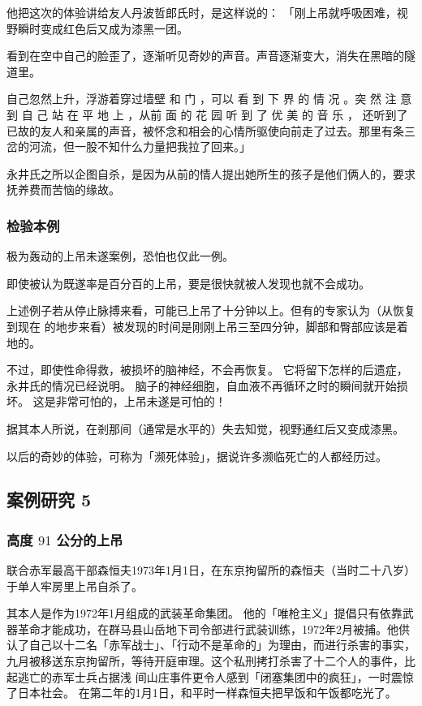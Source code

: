 \documentclass[UTF8]{ctexart}
\begin{document}
他把这次的体验讲给友人丹波哲郎氏时，是这样说的： 「刚上吊就呼吸困难，视野瞬时变成红色后又成为漆黑一团。

看到在空中自己的脸歪了，逐渐听见奇妙的声音。声音逐渐变大，消失在黑暗的隧道里。

自己忽然上升，浮游着穿过墙壁 和 门 ，可以 看 到 下 界 的 情 况 。突 然 注 意 到 自 己 站 在 平 地 上 ，从前 面 的 花 园 听 到 了 优 美 的 音 乐 ， 还听到了已故的友人和亲属的声音，被怀念和相会的心情所驱使向前走了过去。那里有条三岔的河流，但一股不知什么力量把我拉了回来。」 

永井氏之所以企图自杀，是因为从前的情人提出她所生的孩子是他们俩人的，要求抚养费而苦恼的缘故。

\subsubsection*{检验本例}

极为轰动的上吊未遂案例，恐怕也仅此一例。

即使被认为既遂率是百分百的上吊，要是很快就被人发现也就不会成功。

上述例子若从停止脉搏来看，可能已上吊了十分钟以上。但有的专家认为（从恢复到现在
的地步来看）被发现的时间是刚刚上吊三至四分钟，脚部和臀部应该是着地的。

不过，即使性命得救，被损坏的脑神经，不会再恢复。
它将留下怎样的后遗症，永井氏的情况已经说明。
脑子的神经细胞，自血液不再循环之时的瞬间就开始损坏。
这是非常可怕的，上吊未遂是可怕的！

据其本人所说，在剎那间（通常是水平的）失去知觉，视野通红后又变成漆黑。

以后的奇妙的体验，可称为「濒死体验」，据说许多濒临死亡的人都经历过。

\subsection{案例研究 5}
\subsubsection*{高度 $91$ 公分的上吊}

联合赤军最高干部森恒夫1973年1月1日，在东京拘留所的森恒夫（当时二十八岁）于单人牢房里上吊自杀了。

其本人是作为1972年1月组成的武装革命集团。
他的「唯枪主义」提倡只有依靠武器革命才能成功，在群马县山岳地下司令部进行武装训练，1972年2月被捕。他供认了自己以十二名「赤军战士」、「行动不是革命的」为理由，而进行杀害的事实，九月被移送东京拘留所，等待开庭审理。这个私刑拷打杀害了十二个人的事件，比起逃亡的赤军士兵占据浅 间山庄事件更令人感到「闭塞集团中的疯狂」，一时震惊了日本社会。 在第二年的1月1日，和平时一样森恒夫把早饭和午饭都吃光了。
\end{document}
